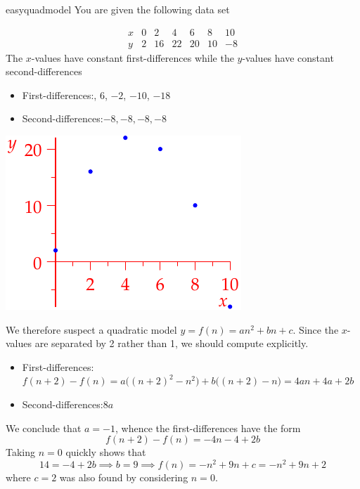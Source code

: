 \begin{example}{}{easyquadmodel}
You are given the following data set\par
\begin{minipage}[t]{0.65\linewidth}\vspace{-8pt}
\[\begin{array}{c|cccccc}
x&0&2&4&6&8&10\\\hline
y&2&16&22&20&10&-8
\end{array}\]
The $x$-values have constant first-differences while the $y$-values have constant second-differences
\begin{itemize}
  \item[]First-differences:, 6, $-2$, $-10$, $-18$
  \item[]Second-differences:\lstsp $-8,-8,-8,-8$
\end{itemize}
\end{minipage}\hfill\begin{minipage}[t]{0.34\linewidth}\vspace{-10pt}
\flushright\includegraphics{seqquadex2}
\end{minipage}
\bigbreak

We therefore suspect a quadratic model $y=f(n)=an^2+bn+c$. Since the $x$-values are separated by 2 rather than 1, we should compute explicitly.\footnotemark
\begin{itemize}
  \item[]First-differences:\lstsp $f(n+2)-f(n)=a\bigl((n+2)^2-n^2\bigr)+b\bigl((n+2)-n\bigr) =4an+4a+2b$
  \item[]Second-differences:\lstsp $8a$
\end{itemize}
We conclude that $a=-1$, whence the first-differences have the form
\[f(n+2)-f(n)=-4n-4+2b\]
Taking $n=0$ quickly shows that
\[14=-4+2b\implies b=9\implies f(n)=-n^2+9n+c= -n^2+9n+2\]
where $c=2$ was also found by considering $n=0$.
\end{example}

